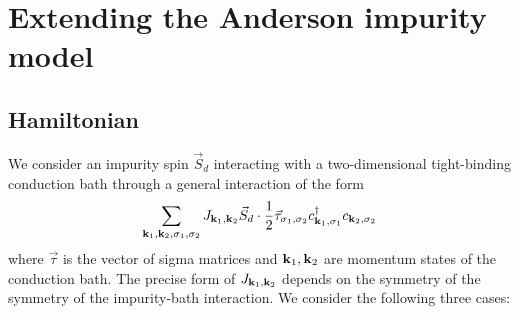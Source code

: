 \documentclass[reprint,hidelinks]{revtex4-2}
\begin{document}
\section{Extending the Anderson impurity model}
\subsection{Hamiltonian}
We consider an impurity spin \(\vec S_d\) interacting with a two-dimensional tight-binding conduction bath through a general interaction of the form
\begin{equation}\begin{aligned}
		\sum_{{\bf k}_1, {\bf k}_2, \sigma_1, \sigma_2} J_{{\bf k}_1, {\bf k}_2} \vec{S}_d\cdot\frac{1}{2}\vec{\tau}_{\sigma_1,\sigma_2} c^\dagger_{{\bf k}_1,\sigma_1}c_{{\bf k}_2,\sigma_2}
\end{aligned}\end{equation}
where \(\vec \tau\) is the vector of sigma matrices and \({\bf k}_1,{\bf k}_2\) are momentum states of the conduction bath. The precise form of \(J_{{\bf k}_1, {\bf k}_2}\) depends on the symmetry of the symmetry of the impurity-bath interaction. We consider the following three cases:
\end{document}
